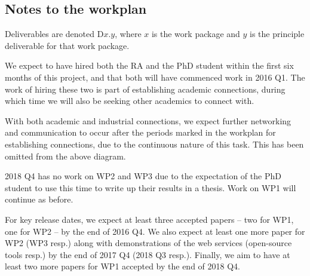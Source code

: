 \documentclass[a4paper,11pt]{article}
\begin{document}
\begin{landscape}
    \subsection*{Notes to the workplan}

    Deliverables are denoted D$x.y$, where $x$ is the work package and $y$ is the principle deliverable for that work package.

    We expect to have hired both the RA and the PhD student within the first six months of this project, and that both will have commenced work in 2016 Q1. The work of hiring these two is part of establishing academic connections, during which time we will also be seeking other academics to connect with.

    With both academic and industrial connections, we expect further networking and communication to occur after the periods marked in the workplan for establishing connections, due to the continuous nature of this task. This has been omitted from the above diagram.

    2018 Q4 has no work on WP2 and WP3 due to the expectation of the PhD student to use this time to write up their results in a thesis. Work on WP1 will continue as before.

    For key release dates, we expect at least three accepted papers -- two for WP1, one for WP2 -- by the end of 2016 Q4. We also expect at least one more paper for WP2 (WP3 resp.) along with demonstrations of the web services (open-source tools resp.) by the end of 2017 Q4 (2018 Q3 resp.). Finally, we aim to have at least two more papers for WP1 accepted by the end of 2018 Q4.

    \end{landscape}
\end{document}
